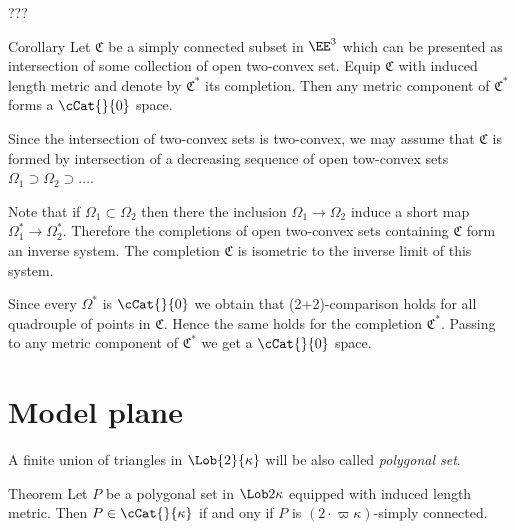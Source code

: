 ???
\qeds


























\begin{thm}{Corollary}
Let $\mathfrak{C}$ be a simply connected subset in $\EE^3$ 
which can be presented as intersection of some collection 
of open two-convex set.
Equip $\mathfrak{C}$ with induced length metric and denote by $\mathfrak{C}^*$ its completion.
Then any metric component of $\mathfrak{C}^*$ forms a $\cCat{}{0}$ space.
\end{thm}

Since the intersection of two-convex sets is two-convex,
we may assume that $\mathfrak{C}$ is formed by intersection of a decreasing sequence of open tow-convex sets $\Omega_1\supset\Omega_2\supset\dots$.

Note that if $\Omega_1\subset \Omega_2$ then there the inclusion
$\Omega_1\to \Omega_2$ induce a short map $\Omega_1^*\to \Omega_2^*$.
Therefore the completions of open two-convex sets containing $\mathfrak{C}$ form an inverse system.
The completion $\mathfrak{C}$ is isometric to the inverse limit of this system.

Since every $\Omega^*$ is $\cCat{}{0}$ we obtain that (2+2)-comparison holds for all quadrouple of points in $\mathfrak{C}$.
Hence the same holds for the completion $\mathfrak{C}^*$.
Passing to any metric component of $\mathfrak{C}^*$ we get a $\cCat{}{0}$ space.
\qeds











\section{Model plane}

A finite union of triangles in $\Lob{2}{\kappa}$ will be also called \emph{polygonal set}.


\begin{thm}{Theorem}\label{thm:polygon-CAT}
Let $P$ be a polygonal set in $\Lob2\kappa$ equipped with induced length metric.
Then $P\in\cCat{}{\kappa}$ if and ony if $P$ is $(2\cdot\varpi\kappa)$-simply connected. 
\end{thm}

